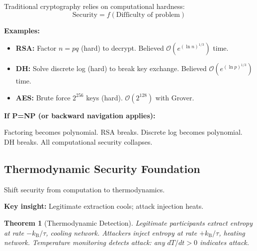 \documentclass[twocolumn,10pt]{revtex4-2}
\newtheorem{theorem}{Theorem}[section]
\theoremstyle{definition}
\theoremstyle{remark}
\newcommand{\kB}{k_{\mathrm{B}}}
\newcommand{\bigO}{\mathcal{O}}
\begin{document}
Traditional cryptography \cite{Diffie1976,Rivest1978} relies on computational hardness:
\begin{equation}
\text{Security} = f(\text{Difficulty of problem})
\end{equation}

\textbf{Examples:}
\begin{itemize}
\item \textbf{RSA:} Factor $n = pq$ (hard) to decrypt. Believed $\bigO(e^{(\ln n)^{1/3}})$ time.
\item \textbf{DH:} Solve discrete log (hard) to break key exchange. Believed $\bigO(e^{(\ln p)^{1/3}})$ time.
\item \textbf{AES:} Brute force $2^{256}$ keys (hard). $\bigO(2^{128})$ with Grover.
\end{itemize}

\vspace{0.2cm}
\noindent\textbf{If P=NP (or backward navigation applies):}

Factoring becomes polynomial. RSA breaks. Discrete log becomes polynomial. DH breaks. All computational security collapses.

\subsection{Thermodynamic Security Foundation}

Shift security from computation to thermodynamics.

\textbf{Key insight:} Legitimate extraction cools; attack injection heats.

\begin{theorem}[Thermodynamic Detection]
\label{thm:thermodynamic_detection}
Legitimate participants extract entropy at rate $-\kB/\tau$, cooling network. Attackers inject entropy at rate $+\kB/\tau$, heating network. Temperature monitoring detects attack: any $dT/dt > 0$ indicates attack.
\end{theorem}
\end{document}

